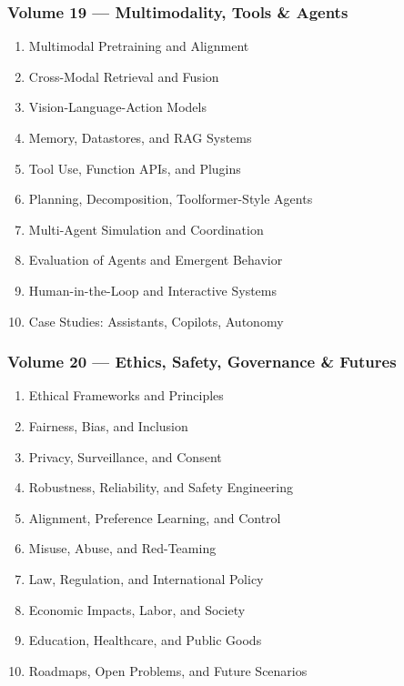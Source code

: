 \documentclass[
  letterpaper,
  DIV=11,
  numbers=noendperiod]{scrreprt}
\providecommand{\tightlist}{%
  \setlength{\itemsep}{0pt}\setlength{\parskip}{0pt}}
\begin{document}
\subsubsection{Volume 19 --- Multimodality, Tools \&
Agents}\label{volume-19-multimodality-tools-agents}

\begin{enumerate}
\def\labelenumi{\arabic{enumi}.}
\setcounter{enumi}{180}
\tightlist
\item
  Multimodal Pretraining and Alignment
\item
  Cross-Modal Retrieval and Fusion
\item
  Vision-Language-Action Models
\item
  Memory, Datastores, and RAG Systems
\item
  Tool Use, Function APIs, and Plugins
\item
  Planning, Decomposition, Toolformer-Style Agents
\item
  Multi-Agent Simulation and Coordination
\item
  Evaluation of Agents and Emergent Behavior
\item
  Human-in-the-Loop and Interactive Systems
\item
  Case Studies: Assistants, Copilots, Autonomy
\end{enumerate}

\subsubsection{Volume 20 --- Ethics, Safety, Governance \&
Futures}\label{volume-20-ethics-safety-governance-futures}

\begin{enumerate}
\def\labelenumi{\arabic{enumi}.}
\setcounter{enumi}{190}
\tightlist
\item
  Ethical Frameworks and Principles
\item
  Fairness, Bias, and Inclusion
\item
  Privacy, Surveillance, and Consent
\item
  Robustness, Reliability, and Safety Engineering
\item
  Alignment, Preference Learning, and Control
\item
  Misuse, Abuse, and Red-Teaming
\item
  Law, Regulation, and International Policy
\item
  Economic Impacts, Labor, and Society
\item
  Education, Healthcare, and Public Goods
\item
  Roadmaps, Open Problems, and Future Scenarios
\end{enumerate}
\end{document}
